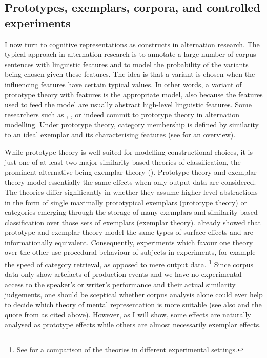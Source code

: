 \subsection{Prototypes, exemplars, corpora, and controlled experiments}
\label{sec:prototypesexemplarscorporaandcontrolledexperiments}

I now turn to cognitive representations as constructs in alternation research.
The typical approach in alternation research is to annotate a large number of corpus sentences with linguistic features and to model the probability of the variants being chosen given these features.
The idea is that a variant is chosen when the influencing features have certain typical values.
In other words, a variant of prototype theory with features \citep{Rosch1978} is the appropriate model, also because the features used to feed the model are usually abstract high-level linguistic features.
Some researchers such as \citet{Gries2003}, \citet{NessetJanda2010}, or \citet{Schaefer2016c} indeed commit to prototype theory in alternation modelling.
Under prototype theory, category membership is defined by similarity to an ideal exemplar and its characterising features (see \citealp{Taylor2008} for an overview).

While prototype theory is well suited for modelling constructional choices, it is just one of at least two major similarity-based theories of classification, the prominent alternative being exemplar theory (\citealp{MedinSchaffer1978,Hintzman1986}).
Prototype theory and exemplar theory model essentially the same effects when only output data are considered.
The theories differ significantly in whether they assume higher-level abstractions in the form of single maximally prototypical exemplars (prototype theory) or categories emerging through the storage of many exemplars and similarity-based classification over those sets of exemplars (exemplar theory).
\citet{Barsalou1990} already showed that prototype and exemplar theory model the same types of surface effects and are informationally equivalent.
Consequently, experiments which favour one theory over the other use procedural behaviour of subjects in experiments, for example the speed of category retrieval, as opposed to mere output data.%
\footnote{See \citet{StormsEa2000} for a comparison of the theories in different experimental settings.}
Since corpus data only show artefacts of production events and we have no experimental access to the speaker's or writer's performance and their actual similarity judgements, one should be sceptical whether corpus analysis alone could ever help to decide which theory of mental representation is more suitable (see also \citealp[22]{Gries2003} and the quote from \citealp[486--487]{Dabrowska2016} as cited above).
However, as I will show, some effects are naturally analysed as prototype effects while others are almost necessarily exemplar effects.

